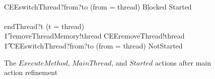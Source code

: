 \begin{figure}[t!]
\begin{circusaction}
    {} \extchoice {} \\
    CEEswitchThread?from?to \prefixcolon (from = thread) \then Blocked \circseq Started \\
    {} \extchoice {} \\
    endThread?t \prefixcolon (t = thread) \then \Skip
    \circblockend \circseq \\
    \t1 removeThreadMemory!thread \then CEEremoveThread!thread \\
    \t1 {} \then CEEswitchThread?from?to \prefixcolon (from = thread) \then NotStarted
  \end{circusaction}
  \caption{The $ExecuteMethod$, $MainThread$, and $Started$ actions
    after main action refinement}
  \label{refine-main-actions-example-figure}
\end{figure}

